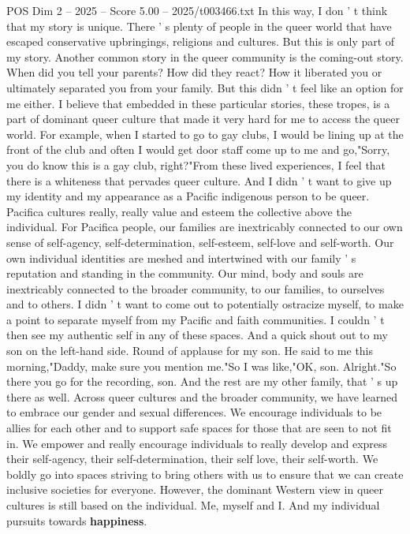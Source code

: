 \begin{textsample}{POS Dim 2 – 2025 – Score 5.00 – 2025/t003466.txt}
In this way, I don ' t think that my story is unique.
There ' s plenty of people in the queer world that have escaped conservative upbringings, religions and cultures.
But this is only part of my story.
Another common story in the queer community is the coming-out story.
When did you tell your parents?
How did they react?
How it liberated you or ultimately separated you from your family.
But this didn ' t feel like an option for me either.
I believe that embedded in these particular stories, these tropes, is a part of dominant queer culture that made it very hard for me to access the queer world.
For example, when I started to go to gay clubs, I would be lining up at the front of the club and often I would get door staff come up to me and go,"Sorry, you do know this is a gay club, right?"From these lived experiences, I feel that there is a whiteness that pervades queer culture.
And I didn ' t want to give up my identity and my appearance as a Pacific indigenous person to be queer.
Pacifica cultures really, really value and esteem the collective above the individual.
For Pacifica people, our families are inextricably connected to our own sense of self-agency, self-determination, self-esteem, self-love and self-worth.
Our own individual identities are meshed and intertwined with our family ' s reputation and standing in the community.
Our mind, body and souls are inextricably connected to the broader community, to our families, to ourselves and to others.
I didn ' t want to come out to potentially ostracize myself, to make a point to separate myself from my Pacific and faith communities.
I couldn ' t then see my authentic self in any of these spaces.
And a quick shout out to my son on the left-hand side.
Round of applause for my son.
He said to me this morning,"Daddy, make sure you mention me."So I was like,"OK, son.
Alright."So there you go for the recording, son.
And the rest are my other family, that ' s up there as well.
Across queer cultures and the broader community, we have learned to embrace our gender and sexual differences.
We encourage individuals to be allies for each other and to support safe spaces for those that are seen to not fit in.
We empower and really encourage individuals to really develop and express their self-agency, their self-determination, their self love, their self-worth.
We boldly go into spaces striving to bring others with us to ensure that we can create inclusive societies for everyone.
However, the dominant Western view in queer cultures is still based on the individual.
Me, myself and I.
And my individual pursuits towards \textbf{happiness}.

\end{textsample}
